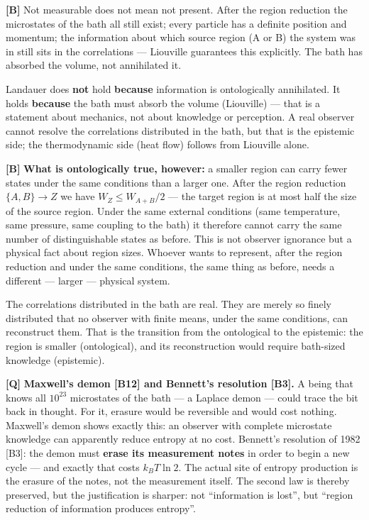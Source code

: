 \textbf{[B]} Not measurable does not mean not present. After the region reduction the
microstates of the bath all still exist; every particle has a definite position
and momentum; the information about which source region (A or B) the system was in
still sits in the correlations --- Liouville guarantees this explicitly. The bath
has absorbed the volume, not annihilated it.

Landauer does \textbf{not} hold \textbf{because} information is ontologically
annihilated. It holds \textbf{because} the bath must absorb the volume (Liouville)
--- that is a statement about mechanics, not about knowledge or perception. A real
observer cannot resolve the correlations distributed in the bath, but that is the
epistemic side; the thermodynamic side (heat flow) follows from Liouville alone.

\textbf{[B]} \textbf{What is ontologically true, however:} a smaller region can carry fewer
states under the same conditions than a larger one. After the region reduction
$\{A,B\} \to Z$ we have $W_Z \le W_{A+B}/2$ --- the target region is at most half
the size of the source region. Under the same external conditions (same
temperature, same pressure, same coupling to the bath) it therefore cannot carry
the same number of distinguishable states as before. This is not observer
ignorance but a physical fact about region sizes. Whoever wants to represent, after
the region reduction and under the same conditions, the same thing as before,
needs a different --- larger --- physical system.

The correlations distributed in the bath are real. They are merely so finely
distributed that no observer with finite means, under the same conditions, can
reconstruct them. That is the transition from the ontological to the epistemic:
the region is smaller (ontological), and its reconstruction would require
bath-sized knowledge (epistemic).

\textbf{[Q]} \textbf{Maxwell's demon [B12] and Bennett's resolution [B3].} A being that
knows all $10^{23}$ microstates of the bath --- a Laplace demon --- could trace
the bit back in thought. For it, erasure would be reversible and would cost
nothing. Maxwell's demon shows exactly this: an observer with complete
microstate knowledge can apparently reduce entropy at no cost. Bennett's
resolution of 1982 [B3]: the demon must \textbf{erase its measurement notes} in
order to begin a new cycle --- and exactly that costs $k_B T \ln 2$. The actual
site of entropy production is the erasure of the notes, not the measurement
itself. The second law is thereby preserved, but the justification is sharper: not
“information is lost”, but “region reduction of information produces entropy”.

